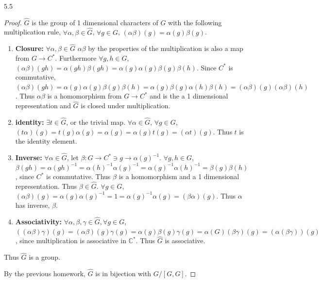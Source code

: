 \documentclass{article}
\newcommand{\C}{\mathbb{C}}
\begin{document}
\begin{PROB}{5.5}\label{Problem 5.5.}
\end{PROB}
\begin{proof}
    $\widehat{G}$ is the group of 1 dimensional characters of $G$ with the following multiplication rule, $\forall \alpha, \beta \in \widehat{G}$, $\forall g \in G$, $(\alpha\beta)(g) = \alpha(g)\beta(g)$.
    
    \begin{enumerate}
        \item \textbf{Closure:} $\forall \alpha, \beta \in \widehat{G}$ $\alpha \beta$ by the properties of the multiplication is also a map from $G \to C^*$. Furthermore $\forall g, h \in G$, $(\alpha \beta)(g h) = \alpha(g h)\beta(g h) = \alpha(g)\alpha(g)\beta(g)\beta(h)$. Since $C^*$ is commutative, $(\alpha \beta)(g h)  = \alpha(g)\alpha(g)\beta(g)\beta(h) = \alpha(g)\beta(g) \alpha(h) \beta(h) = (\alpha \beta)(g) (\alpha \beta)(h)$. Thus $\alpha \beta$ is a homomorphism from $G \to C^*$ and is the a 1 dimensional representation and $\widehat{G}$ is closed under multiplication.
        \item \textbf{identity: } $\exists t \in \widehat{G}$, or the trivial map. $\forall \alpha \in \widehat{G}$, $\forall g \in G$, $(t \alpha)(g) = t(g) \alpha(g) = \alpha(g) = \alpha(g) t(g) = (\alpha t)(g)$. Thus $t$ is the identity element. 
        \item \textbf{Inverse: } $\forall \alpha \in \widehat{G}$, let $\beta: G \to C^* \ni g \to \alpha(g)^{-1}$. $\forall g, h  \in G$, $\beta(gh) = \alpha(gh)^{-1} = \alpha(h)^{-1} \alpha(g)^{-1} = \alpha(g)^{-1} \alpha(h)^{-1} = \beta(g) \beta(h)$, since $C^*$ is commutative. Thus $\beta$ is a homomorphism and a 1 dimensional representation. Thus $\beta \in \widehat{G}$. $\forall g \in G$, $(\alpha \beta)(g) = \alpha(g) \alpha(g)^{-1} = 1 = \alpha(g)^{-1} \alpha(g) = (\beta \alpha)(g)$. Thus $\alpha$ has inverse, $\beta$.
        \item \textbf{Associativity: } $\forall \alpha, \beta , \gamma \in \widehat{G}, \forall g \in G$, $((\alpha \beta) \gamma)(g) = (\alpha \beta)(g) \gamma(g) = \alpha(g) \beta(g) \gamma(g) = \alpha(G) (\beta \gamma)(g) = (\alpha (\beta \gamma))(g)$, since multiplication is associative in $\C^*$. Thus $\widehat{G}$ is associative.                      
    \end{enumerate}

    Thus $\widehat{G}$ is a group. 
    
    By the previous homework, $\widehat{G}$ is in bijection with $G / [G, G]$.


\end{proof}
\end{document}
